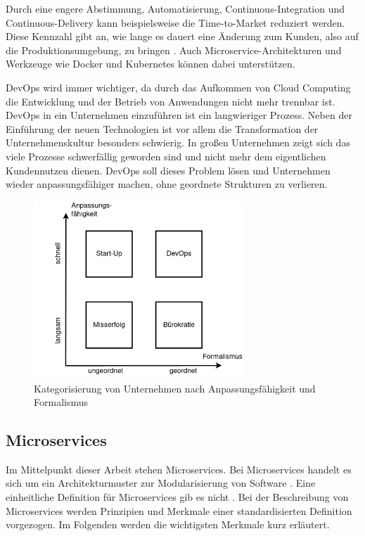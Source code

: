 Durch eine engere Abstimmung, Automatisierung, Continuous-Integration und Continuous-Delivery kann beispielsweise die Time-to-Market reduziert werden. Diese Kennzahl gibt an, wie lange es dauert eine Änderung zum Kunden, also auf die Produktionsumgebung, zu bringen \parencite[vgl.][S. 7]{halstenbergDevOps2020}. Auch Microservice-Architekturen und Werkzeuge wie Docker und Kubernetes können dabei unterstützen.

DevOps wird immer wichtiger, da durch das Aufkommen von Cloud Computing die Entwicklung und der Betrieb von Anwendungen nicht mehr trennbar ist. DevOps in ein Unternehmen einzuführen ist ein langwieriger Prozess. Neben der Einführung der neuen Technologien ist vor allem die Transformation der Unternehmenskultur besonders schwierig. In großen Unternehmen zeigt sich das viele Prozesse schwerfällig geworden sind und nicht mehr dem eigentlichen Kundennutzen dienen. DevOps soll dieses Problem lösen und Unternehmen wieder anpassungsfähiger machen, ohne geordnete Strukturen zu verlieren.

\begin{figure}[H] 
    \centering
    \includegraphics[width=0.7\textwidth]{figures/DevOpsKategroisierung.png}
    \caption{Kategorisierung von Unternehmen nach Anpassungsfähigkeit und Formalismus \parencite[vgl.][S. 11]{halstenbergDevOps2020}}
\end{figure}

\subsection{Microservices}

Im Mittelpunkt dieser Arbeit stehen Microservices. Bei Microservices handelt es sich um ein Architekturmuster zur Modularisierung von Software \parencite[vgl.][S. 15]{newmanMicroservices2015}. Eine einheitliche Definition für Microservices gib es nicht \parencite[vgl.][S. 2]{wolffMicroservices2018}. Bei der Beschreibung von Microservices werden Prinzipien und Merkmale einer standardisierten Definition vorgezogen. Im Folgenden werden die wichtigsten Merkmale kurz erläutert.

